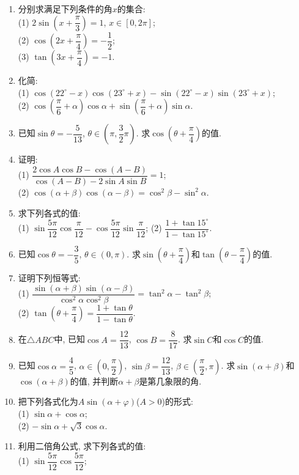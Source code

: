 \documentclass[10pt,a4paper]{article}
\begin{document}
\begin{enumerate}[1.]
\item 分别求满足下列条件的角$x$的集合:\\
(1) $2\sin (x+\dfrac\pi 3)=1$, $x\in [0, 2\pi ]$;\\
(2) $\cos (2x+\dfrac \pi 4)=-\dfrac 12$;\\
(3) $\tan (3x+\dfrac \pi 4)=-1$.
\item 化简:\\
(1) $\cos (22^\circ -x)\cos (23^\circ +x)-\sin (22^\circ -x)\sin (23^\circ +x)$;\\
(2) $\cos (\dfrac\pi 6+\alpha)\cos \alpha+\sin (\dfrac \pi 6+\alpha)\sin \alpha$.
\item 已知$\sin \theta =-\dfrac 5{13}$, $\theta \in (\pi , \dfrac3 2\pi )$. 求$\cos (\theta +\dfrac \pi 4)$的值.
\item 证明:\\
(1) $\dfrac{2\cos A\cos B-\cos (A-B)}{\cos (A-B)-2\sin A\sin B}=1$;\\
(2) $\cos (\alpha+\beta)\cos (\alpha-\beta)=\cos^2\beta-\sin ^2\alpha$.
\item 求下列各式的值:\\
(1) $\sin \dfrac{5\pi}{12}\cos \dfrac\pi{12}-\cos \dfrac{5\pi}{12}\sin \dfrac\pi {12}$;
(2) $\dfrac{1+\tan 15^\circ}{1-\tan 15^\circ}$.
\item 已知$\cos \theta =-\dfrac 35$, $\theta \in (0, \pi)$. 求$\sin (\theta +\dfrac\pi 4)$和$\tan (\theta -\dfrac\pi 4)$的值.
\item 证明下列恒等式:\\
(1) $\dfrac{\sin (\alpha+\beta)\sin (\alpha-\beta)}{\cos^2\alpha\cos^2\beta}=\tan^2\alpha-\tan^2\beta$;\\
(2) $\tan (\theta +\dfrac\pi 4)=\dfrac{1+\tan \theta}{1-\tan \theta}$.
\item 在$\triangle ABC$中, 已知$\cos A=\dfrac{12}{13}$, $\cos B=\dfrac8{17}$. 求$\sin C$和$\cos C$的值.
\item 已知$\cos \alpha=\dfrac 45$, $\alpha\in (0, \dfrac \pi 2)$, $\sin \beta=\dfrac{12}{13}$, $\beta\in (\dfrac\pi 2, \pi )$. 求$\sin (\alpha+\beta)$和$\cos (\alpha+\beta)$的值, 并判断$\alpha+\beta$是第几象限的角.
\item 把下列各式化为$A\sin (\alpha+\varphi )$($A>0$)的形式:\\
(1) $\sin \alpha+\cos \alpha$;\\
(2) $-\sin \alpha+\sqrt 3\cos \alpha$.
\item 利用二倍角公式, 求下列各式的值:\\
(1) $\sin \dfrac{5\pi}{12}\cos\dfrac{5\pi}{12}$;\\

\end{enumerate}
\end{document}
